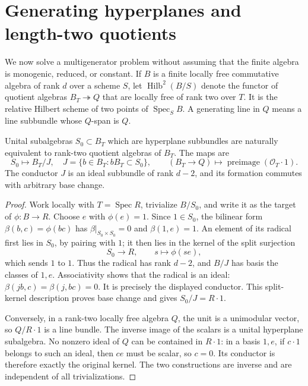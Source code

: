 \section{Generating hyperplanes and length-two quotients}
\label{sec:quotient-hilbert}
We now solve a multigenerator problem without assuming that the finite
algebra is monogenic, reduced, or constant. If $B$ is a finite locally
free commutative algebra of rank $d$ over a scheme $S$, let
$\operatorname{Hilb}^2(B/S)$ denote the functor of quotient algebras
$B_T\twoheadrightarrow Q$ that are locally free of rank two over $T$.
It is the relative Hilbert scheme of two points of $\operatorname{Spec}_S B$.
A generating line in $Q$ means a line subbundle whose $Q$-span is $Q$.

\begin{lemma}\label{lem:hyperplane-subalgebra}
Unital subalgebras $S_0\subset B_T$ which are hyperplane subbundles
are naturally equivalent to rank-two quotient algebras of $B_T$.
The maps are
\[
 S_0\longmapsto B_T/J,\quad J=\{b\in B_T:bB_T\subset S_0\},
 \qquad
 (B_T\to Q)\longmapsto\operatorname{preimage}(\mathcal O_T\cdot1).
\]
The conductor $J$ is an ideal subbundle of rank $d-2$, and its
formation commutes with arbitrary base change.
\end{lemma}
\begin{proof}
Work locally with $T=\operatorname{Spec}R$, trivialize $B/S_0$, and
write it as the target of $\phi:B\to R$. Choose $e$ with $\phi(e)=1$.
Since $1\in S_0$, the bilinear form $\beta(b,c)=\phi(bc)$ has
$\beta|_{S_0\times S_0}=0$ and $\beta(1,e)=1$.
An element of its radical first lies in $S_0$, by pairing with $1$;
it then lies in the kernel of the split surjection
\[
 S_0\longrightarrow R,\qquad s\longmapsto\phi(se),
\]
which sends $1$ to $1$. Thus the radical has rank $d-2$, and
$B/J$ has basis the classes of $1,e$. Associativity shows that the
radical is an ideal: $\beta(jb,c)=\beta(j,bc)=0$. It is precisely
the displayed conductor. This split-kernel description proves base
change and gives $S_0/J=R\cdot1$.

Conversely, in a rank-two locally free algebra $Q$, the unit is a
unimodular vector, so $Q/R\cdot1$ is a line bundle. The inverse
image of the scalars is a unital hyperplane subalgebra. No nonzero
ideal of $Q$ can be contained in $R\cdot1$: in a basis $1,e$, if
$c\cdot1$ belongs to such an ideal, then $ce$ must be scalar, so
$c=0$. Its conductor is therefore exactly the original kernel.
The two constructions are inverse and are independent of all
trivializations.
\end{proof}

